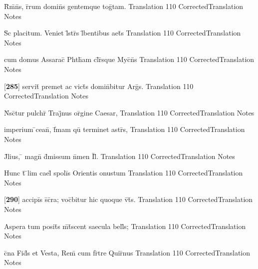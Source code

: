 \documentclass[]{book}
\begin{document}
\latline
  {R\={}m\={}n\={}s, r\={}rum domin\={}s gentemque tog\={}tam.}
  { Translation }
  {110}
  { CorrectedTranslation }
  { Notes }


\latline
  {S\={\macron {\i}}c placitum.  Veniet l\={}str\={\macron {\i}}s l\={}bentibus aet\={}s}
  { Translation }
  {110}
  { CorrectedTranslation }
  { Notes }


\latline
  {cum domus Assarac\={\macron {\i}} Phth\={\macron {\i}}am cl\={}r\={}sque Myc\={}n\={}s}
  { Translation }
  {110}
  { CorrectedTranslation }
  { Notes }


\latline
  {[\textbf{285}] servit\={} premet ac vict\={\macron {\i}}s domin\={}bitur Arg\={\macron {\i}}s.}
  { Translation }
  {110}
  { CorrectedTranslation }
  { Notes }


\latline
  {N\={}sc\={}tur pulchr\={} Traj\={}nus or\={\macron {\i}}gine Caesar,}
  { Translation }
  {110}
  { CorrectedTranslation }
  { Notes }


\latline
  {imperium \={}cean\={}, f\={}mam qu\={\macron {\i}} terminet astr\={\macron {\i}}s,}
  { Translation }
  {110}
  { CorrectedTranslation }
  { Notes }


\latline
  {J\={}lius, \={} magn\={} d\={}missum n\={}men I\={}l\={}.}
  { Translation }
  {110}
  { CorrectedTranslation }
  { Notes }


\latline
  {Hunc t\={} \={}lim cael\={} spoli\={\macron {\i}}s Orientis onustum}
  { Translation }
  {110}
  { CorrectedTranslation }
  { Notes }


\latline
  {[\textbf{290}] accipi\={}s s\={}c\={}ra; voc\={}bitur hic quoque v\={}t\={\macron {\i}}s.}
  { Translation }
  {110}
  { CorrectedTranslation }
  { Notes }


\latline
  {Aspera tum posit\={\macron {\i}}s m\={\macron {\i}}t\={}scent saecula bell\={\macron {\i}}s;}
  { Translation }
  {110}
  { CorrectedTranslation }
  { Notes }


\latline
  {c\={}na Fid\={}s et Vesta, Rem\={} cum fr\={}tre Quir\={\macron {\i}}nus}
  { Translation }
  {110}
  { CorrectedTranslation }
  { Notes }
\end{document}
